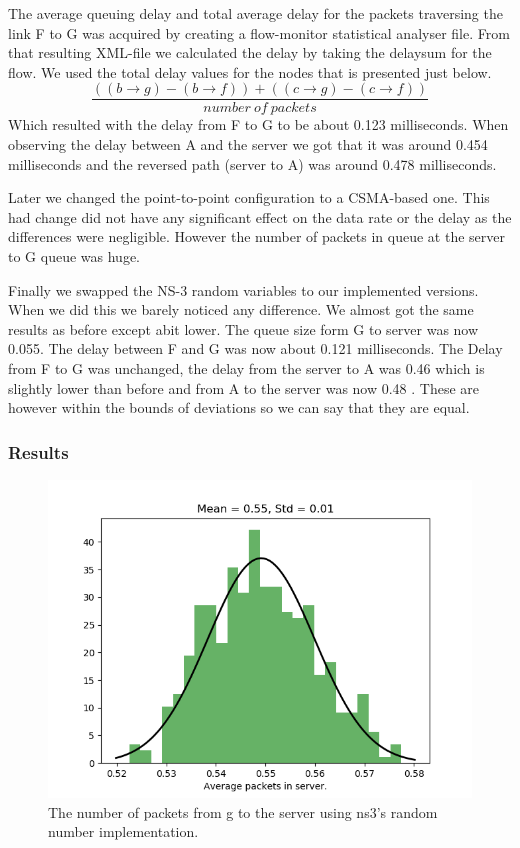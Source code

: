 \documentclass{article}
\begin{document}
The average queuing delay and total average delay for the packets traversing the link F to G 
was acquired by creating a flow-monitor statistical analyser file. From that resulting XML-file 
we calculated the delay by taking the delaysum for the flow. We used the total delay values for 
the nodes that is presented just below.
$$\frac{((b \rightarrow g) - (b \rightarrow f)) + ((c \rightarrow g) - (c \rightarrow f))}{number\ of\ packets}$$
Which resulted with the delay from F to G to be about 0.123 milliseconds.  
When observing the delay between A and the server we got that it was around 0.454 milliseconds 
and the reversed path (server to A) was around 0.478 milliseconds. 

Later we changed the point-to-point configuration to a CSMA-based one. This had change did not 
have any significant effect on the data rate or the delay as the differences were negligible.
However the number of packets in queue at the server to G queue was huge.

Finally we swapped the NS-3 random variables to our implemented versions. When we did this we
barely noticed any difference. We almost got the same results as before except abit lower.
The queue size form G to server was now 0.055.
The delay between F and G was now about 0.121 milliseconds.
The Delay from F to G was unchanged, the delay from the server to A was 0.46 which is slightly 
lower than before and from A to the server was now 0.48 . These are however within the bounds 
of deviations so we can say that they are equal.

\newpage
\subsubsection{Results}
\begin{figure}[!htbp]
    \centering
    \includegraphics[width=0.85\linewidth]{ns3_gs_queue_size.png}
    \caption{The number of packets from g to the server using ns3's random number implementation.}
    \label{fig:GtoServerNs3}
\end{figure}
\end{document}
